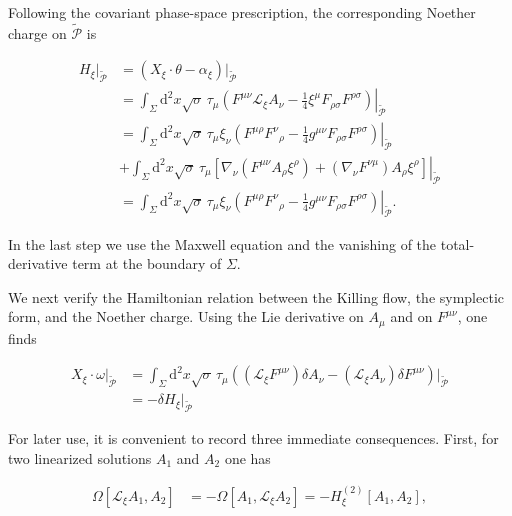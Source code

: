 Following the covariant phase-space prescription, the corresponding Noether charge on $\widetilde{\mathcal{P}}$ is

\begin{align}
H_{\xi}|_{\widetilde{\mathcal{P}}}&=(X_{\xi}\cdot \theta-\alpha _{\xi})|_{\widetilde{\mathcal{P}}} \\
 & =\left.\int _{\Sigma}\mathrm{d}^{2}x\sqrt{ \sigma }\,\tau _{\mu}\left(F^{\mu \nu}\mathcal{L}_{\xi}A_{\nu}-\frac{1}{4}\xi ^{\mu}F_{\rho \sigma}F^{\rho \sigma}\right)\right|_{\widetilde{\mathcal{P}}} \\
 & =\left.\int _{\Sigma}\mathrm{d}^{2}x\sqrt{ \sigma }\,\tau _{\mu}\xi _{\nu}\left(F^{\mu \rho}F^{\nu}{}_{\rho}-\frac{1}{4}g^{\mu \nu}F_{\rho \sigma}F^{\rho \sigma}\right)\right|_{\widetilde{\mathcal{P}}} \\
 & +\left.\int _{\Sigma}\mathrm{d}^{2}x\sqrt{ \sigma }\,\tau _{\mu}\left[\nabla _{\nu}\left(F^{\mu \nu}A_{\rho}\xi ^{\rho}\right)+\left(\nabla _{\nu}F^{\nu \mu}\right)A_{\rho}\xi ^{\rho}\right]\right|_{\widetilde{\mathcal{P}}} \\
 & =\left.\int _{\Sigma}\mathrm{d}^{2}x\sqrt{ \sigma }\,\tau _{\mu}\xi _{\nu}\left(F^{\mu \rho}F^{\nu}{}_{\rho}-\frac{1}{4}g^{\mu \nu}F_{\rho \sigma}F^{\rho \sigma}\right)\right|_{\widetilde{\mathcal{P}}}.
\end{align}

In the last step we use the Maxwell equation and the vanishing of the total-derivative term at the boundary of $\Sigma$.

We next verify the Hamiltonian relation between the Killing flow, the symplectic form, and the Noether charge. Using the Lie derivative on $A_{\mu}$ and on $F^{\mu\nu}$, one finds

\begin{align}
X_{\xi}\cdot \omega|_{\tilde{\mathcal{P}}}&=\int _{\Sigma}\mathrm{d}^{2}x\sqrt{ \sigma }\,\tau _{\mu}\left((\mathcal{L}_{\xi}F^{\mu \nu})\delta A_{\nu}-(\mathcal{L}_{\xi}A_{\nu})\delta F^{\mu \nu}\right)\bigg|_{\tilde{\mathcal{P}}} \\
 & =-\delta H_{\xi}|_{\tilde{\mathcal{P}}}
\end{align}

For later use, it is convenient to record three immediate consequences. First, for two linearized solutions $A_{1}$ and $A_{2}$ one has

\begin{align}
\Omega[\mathcal{L}_{\xi}A_{1},A_{2}]&=-\Omega[A_{1},\mathcal{L}_{\xi}A_{2}]=-H_{\xi}^{(2)}[A_{1},A_{2}],
\end{align}

